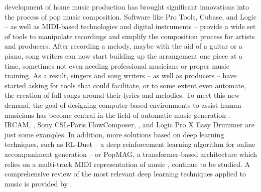 \documentclass[journal]{IEEEtran}
\begin{document}
 development of home music production has brought significant innovations into the process of pop music composition. Software like Pro Tools, Cubase, and Logic -- as well as MIDI-based technologies and digital instruments -- provide a wide set of tools to manipulate recordings and simplify the composition process for artists and producers.
After recording a melody, maybe with the aid of a guitar or a piano, song writers can now start building up the arrangement one piece at a time, sometimes not even needing professional musicians or proper music training. As a result, singers and song writers -- as well as producers -- have started asking for tools that could facilitate, or to some extent even automate, the creation of full songs around their lyrics and melodies. To meet this new demand, the goal of designing computer-based environments to assist human musicians has become central in the field of automatic music generation \cite{briot2020deep}. IRCAM, \cite{assayag1999computer}, 
Sony CSL-Paris FlowComposer, \cite{papadopoulos2016assisted}, and Logic Pro X Easy Drummer are just some examples. In addition, more solutions based on deep learning techniques, such as RL-Duet \cite{jiang2020rl} -- a deep reinforcement learning algorithm for online accompaniment generation -- or PopMAG, a transformer-based architecture which relies on a multi-track MIDI representation of music \cite{ren2020popmag}, continue to be studied. A comprehensive review of the most relevant deep learning techniques applied to music is provided by \cite{briot2020deep}. 
\end{document}
